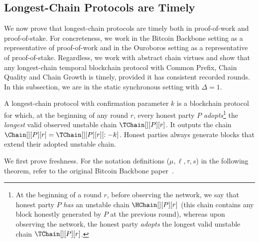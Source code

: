\subsection{Longest-Chain Protocols are Timely}

We now prove that longest-chain protocols are timely both in proof-of-work and proof-of-stake.
For concreteness, we work in the Bitcoin Backbone setting
as a representative of proof-of-work and in the Ouroboros setting
as a representative of proof-of-stake.
Regardless, we work with abstract chain virtues
and show that any longest-chain
temporal blockchain protocol with Common Prefix,
Chain Quality and Chain Growth is timely,
provided it has consistent recorded rounds.
In this subsection, we are in the 
static synchronous setting with $\Delta = 1$.

\begin{definition}
  A longest-chain protocol with confirmation parameter $k$
  is a blockchain protocol for which,
  at the beginning of any round $r$, every honest party $P$ \emph{adopts}\footnote{
    At the beginning of a round $r$, before observing the network, we say that
    honest party $P$ \emph{has} an unstable chain $\HChain[][P][r]$ (this chain
    contains any block honestly generated by $P$ at the previous round), whereas
    upon observing the network, the honest party \emph{adopts} the longest
    valid unstable chain $\TChain[][P][r]$.
  }
  the \emph{longest} valid observed unstable chain $\TChain[][P][r]$. It outputs the
  chain $\Chain[][P][r] = \TChain[][P][r][:-k]$.
  Honest parties always generate blocks that extend their adopted unstable chain.
\end{definition}

We first prove freshness.
For the notation definitions ($\mu, \ell, \tau, s$)
in the following theorem, refer to the original Bitcoin
Backbone paper~\cite{backbone-new}.


